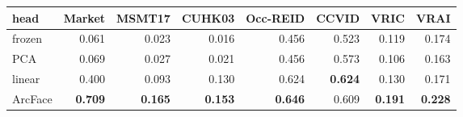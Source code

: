 \begin{tabular}{lrrrrrrr}
\toprule
head & Market & MSMT17 & CUHK03 & Occ-REID & CCVID & VRIC & VRAI \\
\midrule
frozen & 0.061 & 0.023 & 0.016 & 0.456 & 0.523 & 0.119 & 0.174 \\
PCA & 0.069 & 0.027 & 0.021 & 0.456 & 0.573 & 0.106 & 0.163 \\
linear & 0.400 & 0.093 & 0.130 & 0.624 & \textbf{0.624} & 0.130 & 0.171 \\
ArcFace & \textbf{0.709} & \textbf{0.165} & \textbf{0.153} & \textbf{0.646} & 0.609 & \textbf{0.191} & \textbf{0.228} \\
\bottomrule
\end{tabular}
